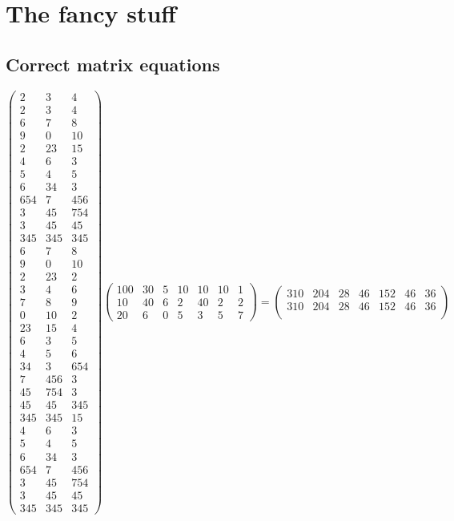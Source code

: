 \documentclass{article}%
\begin{document}
%
\normalsize%
\section{The fancy stuff}%
\label{sec:Thefancystuff}%
\subsection{Correct matrix equations}%
\label{subsec:Correctmatrixequations}%
\[%
\begin{pmatrix}%
2&3&4\\%
2&3&4\\%
6&7&8\\%
9&0&10\\%
2&23&15\\%
4&6&3\\%
5&4&5\\%
6&34&3\\%
654&7&456\\%
3&45&754\\%
3&45&45\\%
345&345&345\\%
6&7&8\\%
9&0&10\\%
2&23&2\\%
3&4&6\\%
7&8&9\\%
0&10&2\\%
23&15&4\\%
6&3&5\\%
4&5&6\\%
34&3&654\\%
7&456&3\\%
45&754&3\\%
45&45&345\\%
345&345&15\\%
4&6&3\\%
5&4&5\\%
6&34&3\\%
654&7&456\\%
3&45&754\\%
3&45&45\\%
345&345&345%
\end{pmatrix} \begin{pmatrix}%
100&30&5&10&10&10&1\\%
10&40&6&2&40&2&2\\%
20&6&0&5&3&5&7%
\end{pmatrix} = \begin{pmatrix}%
310&204&28&46&152&46&36\\%
310&204&28&46&152&46&36\\%

\end{pmatrix}\]
\end{document}
